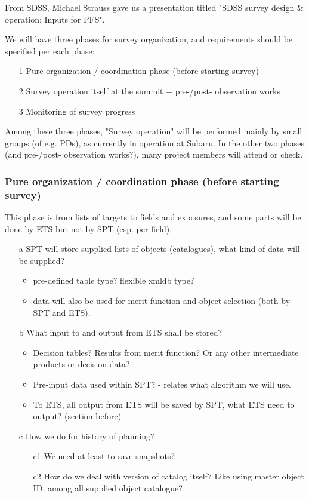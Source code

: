 \documentclass[a4paper,notitlepage]{article}
\begin{document}
From SDSS, Michael Strauss gave us a presentation titled "SDSS survey design 
\& operation: Inputs for PFS". 

We will have three phases for survey organization, and requirements should be 
specified per each phase: 
\begin{enumerate}
  \item[1] Pure organization / coordination phase (before starting survey)
  \item[2] Survey operation itself at the summit + pre-/post- observation works
  \item[3] Monitoring of survey progress
\end{enumerate}
Among these three phases, "Survey operation" will be performed mainly by small 
groups (of e.g. PDs), as currently in operation at Subaru. In the other two 
phases (and pre-/post- observation works?), many project members will attend 
or check.

\subsubsection{Pure organization / coordination phase (before starting survey)}

This phase is from lists of targets to fields and exposures, 
and some parts will be done by ETS but not by SPT (esp. per field). 

\begin{enumerate}
  \item[a] SPT will store supplied lists of objects (catalogues), what kind 
    of data will be supplied? 
    \begin{itemize}
      \item pre-defined table type? flexible xmldb type?
      \item data will also be used for merit function and object selection 
        (both by SPT and ETS).
    \end{itemize}
  \item[b] What input to and output from ETS shall be stored?
    \begin{itemize}
      \item Decision tables? Results from merit function? Or any other 
        intermediate products or decision data?
      \item Pre-input data used within SPT? - relates what algorithm we will use.
      \item To ETS, all output from ETS will be saved by SPT, what ETS need 
        to output? (section before)
    \end{itemize}
  \item[c] How we do for history of planning?
    \begin{enumerate}
      \item[c1] We need at least to save snapshots?
      \item[c2] How do we deal with version of catalog itself? Like using master 
        object ID, among all supplied object catalogue?
    \end{enumerate}
\end{enumerate}
\end{document}
